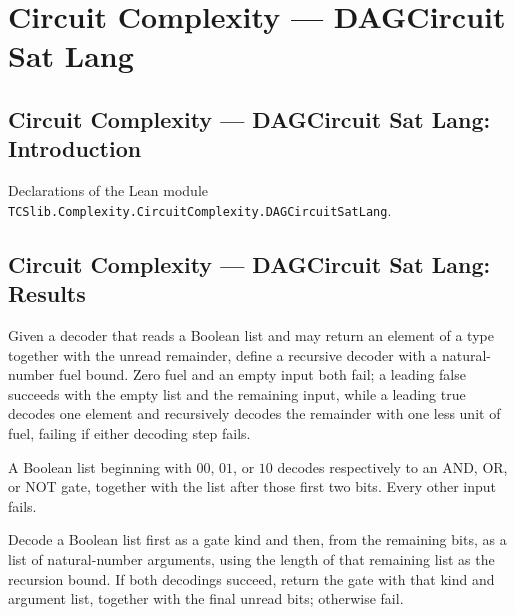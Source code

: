 \section{Circuit Complexity --- DAGCircuit Sat Lang}
\subsection*{Circuit Complexity --- DAGCircuit Sat Lang: Introduction}

Declarations of the Lean module \texttt{TCSlib.Complexity.CircuitComplexity.DAGCircuitSatLang}.

\subsection*{Circuit Complexity --- DAGCircuit Sat Lang: Results}

\begin{definition}
\label{BoolCircuit.decodeList}
\leanok
Given a decoder that reads a Boolean list and may return an element of a type together
with the unread remainder, define a recursive decoder with a natural-number fuel bound.
Zero fuel and an empty input both fail; a leading false succeeds with the empty list and
the remaining input, while a leading true decodes one element and recursively decodes
the remainder with one less unit of fuel, failing if either decoding step fails.
\end{definition}

\begin{definition}
\label{BoolCircuit.GateKind.decode}
\leanok
{}
A Boolean list beginning with $00$, $01$, or $10$ decodes respectively to an AND, OR, or
NOT gate, together with the list after those first two bits. Every other input fails.
\end{definition}

\begin{definition}
\label{BoolCircuit.DAGGate.decode}
\leanok
{}
Decode a Boolean list first as a gate kind and then, from the remaining bits, as a list
of natural-number arguments, using the length of that remaining list as the recursion
bound. If both decodings succeed, return the gate with that kind and argument list,
together with the final unread bits; otherwise fail.
\end{definition}

